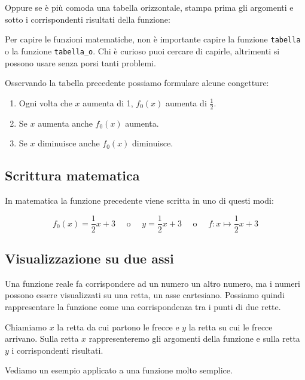 Oppure se è più comoda una tabella orizzontale, stampa prima gli 
argomenti e sotto i corrispondenti risultati della funzione:


\begin{osservazione}
Per capire le funzioni matematiche, non è importante capire 
la funzione \texttt{tabella} o la funzione \texttt{tabella\_o}.
Chi è curioso puoi cercare di capirle, altrimenti si possono usare senza 
porsi tanti problemi.
\end{osservazione}

Osservando la tabella precedente possiamo formulare alcune congetture:

\begin{enumerate} [nosep]
\item Ogni volta che \(x\) aumenta di 1, \(f_0(x)\) aumenta di \(\frac{1}{2}\).
\item Se \(x\) aumenta anche \(f_0(x)\) aumenta.
\item Se \(x\) diminuisce anche \(f_0(x)\) diminuisce.
\end{enumerate}

\subsection{Scrittura matematica}

In matematica la funzione precedente viene scritta in uno di questi modi:

\[f_0(x) = \frac{1}{2}x +3 \quad \text{ o } \quad 
y= \frac{1}{2}x +3 \quad \text{ o } \quad 
f: x \mapsto \frac{1}{2}x +3\]

\subsection{Visualizzazione su due assi}

Una funzione reale fa corrispondere ad un numero un altro numero, ma i 
numeri possono essere visualizzati su una retta, un asse cartesiano. 
Possiamo quindi rappresentare la funzione come una corrispondenza tra i 
punti di due rette.

Chiamiamo \(x\) la retta da cui partono le frecce e \(y\) la retta su cui le 
frecce arrivano.
Sulla retta \(x\) rappresenteremo gli argomenti della funzione e sulla retta 
\(y\) i corrispondenti risultati.

\dueassivuoti

Vediamo un esempio applicato a una funzione molto semplice.


